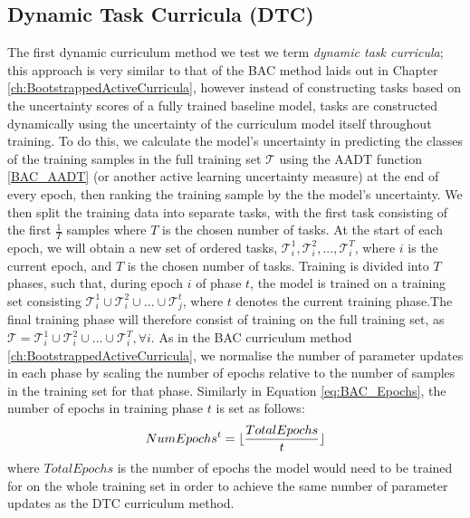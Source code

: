 \subsection{Dynamic Task Curricula (DTC)}\label{sec:DTC}
The first dynamic curriculum method we test we term \textit{dynamic task curricula}; this approach is very similar to that of the BAC method laids out in Chapter \ref{ch:BootstrappedActiveCurricula}, however instead of constructing tasks based on the uncertainty scores of a fully trained baseline model, tasks are constructed dynamically using the uncertainty of the curriculum model itself throughout training. To do this, we calculate the model's uncertainty in predicting the classes of the training samples in the full training set $\mathcal{T}$ using the AADT function \ref{BAC_AADT} (or another active learning uncertainty measure) at the end of every epoch, then ranking the training sample by the the model's uncertainty. We then split the training data into separate tasks, with the first task consisting of the first $\frac{1}{T}$ samples where $T$ is the chosen number of tasks. At the start of each epoch, we will obtain a new set of ordered tasks, $\mathcal{T}_i^1, \mathcal{T}_i^2,...,\mathcal{T}_i^T$, where $i$ is the current epoch, and $T$ is the chosen number of tasks. Training is divided into $T$ phases, such that, during epoch $i$ of phase $t$, the model is trained on a training set consisting $\mathcal{T}_i^1 \cup \mathcal{T}_i^2 \cup ... \cup \mathcal{T}_j^t$, where $t$ denotes the current training phase.The final training phase will therefore consist of training on the full training set, as $\mathcal{T} = \mathcal{T}_i^1 \cup \mathcal{T}_i^2 \cup ... \cup \mathcal{T}_i^T, \forall  i$. As in the BAC curriculum method \ref{ch:BootstrappedActiveCurricula}, we normalise the number of parameter updates in each phase by scaling the number of epochs relative to the number of samples in the training set for that phase. Similarly in Equation \ref{eq:BAC_Epochs}, the number of epochs in training phase $t$ is set as follows:
\begin{equation}\label{eq:DTC_Epochs}
NumEpochs^{t} =\lfloor \frac{TotalEpochs}{t}\rfloor
\end{equation}
where $TotalEpochs$ is the number of epochs the model would need to be trained for on the whole training set in order to achieve the same number of parameter updates as the DTC curriculum method.

